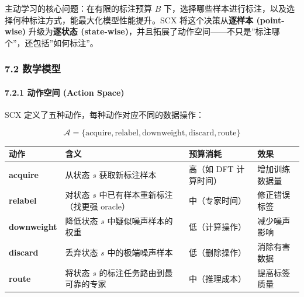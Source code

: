 \documentclass[
  12pt,
]{ctexart}
\begin{document}
主动学习的核心问题：在有限的标注预算 \(B\)
下，选择哪些样本进行标注，以及选择何种标注方式，能最大化模型性能提升。SCX
将这个决策从\textbf{逐样本 (point-wise)} 升级为\textbf{逐状态
(state-wise)}，并且拓展了动作空间------不只是''标注哪个''，还包括''如何标注''。

\subsubsection{7.2 数学模型}\label{ux6570ux5b66ux6a21ux578b-6}

\paragraph{7.2.1 动作空间 (Action
Space)}\label{ux52a8ux4f5cux7a7aux95f4-action-space}

SCX 定义了五种动作，每种动作对应不同的数据操作：

\[
\mathcal{A} = \{ \text{acquire}, \text{relabel}, \text{downweight}, \text{discard}, \text{route} \}
\]

\begin{longtable}[]{@{}
  >{\raggedright\arraybackslash}p{}
  >{\raggedright\arraybackslash}p{}
  >{\raggedright\arraybackslash}p{}
  >{\raggedright\arraybackslash}p{}@{}}
\toprule\noalign{}
\begin{minipage}[b]{\linewidth}\raggedright
动作
\end{minipage} & \begin{minipage}[b]{\linewidth}\raggedright
含义
\end{minipage} & \begin{minipage}[b]{\linewidth}\raggedright
预算消耗
\end{minipage} & \begin{minipage}[b]{\linewidth}\raggedright
效果
\end{minipage} \\
\midrule\noalign{}
\endhead
\bottomrule\noalign{}
\endlastfoot
\textbf{acquire} & 从状态 \(s\) 获取新标注样本 & 高（如 DFT 计算时间） &
增加训练数据量 \\
\textbf{relabel} & 对状态 \(s\) 中已有样本重新标注（找更强 oracle） &
中（专家时间） & 修正错误标签 \\
\textbf{downweight} & 降低状态 \(s\) 中疑似噪声样本的权重 &
低（计算操作） & 减少噪声影响 \\
\textbf{discard} & 丢弃状态 \(s\) 中的极端噪声样本 & 低（删除操作） &
消除有害数据 \\
\textbf{route} & 将状态 \(s\) 的标注任务路由到最可靠的专家 &
中（推理成本） & 提高标签质量 \\
\end{longtable}
\end{document}
